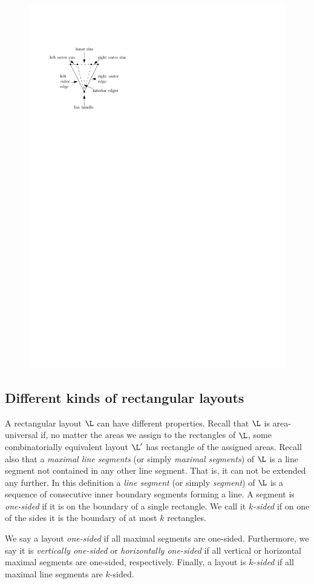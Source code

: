  \begin{figure}[h]
   \centering
   \includegraphics[scale=1]{rectangularDuals/img/fanterms}
   \caption{}
   \label{fig:rect:fanTerms}
 \end{figure}



 \subsection{Different kinds of rectangular layouts}
   A rectangular layout $\L$ can have different properties.
   Recall that $\L$ is area-universal if, no matter the areas we assign to the rectangles of $\L$, some combinatorially equivalent layout $\L'$ has rectangle of the assigned areas.
   Recall also that a \emph{maximal line segments} (or simply \emph{maximal segments}) of $\L$ is a line segment not contained in any other line segment. That is, it can not be extended any further. In this definition a \emph{line segment} (or simply \emph{segment}) of $\L$ is a sequence of consecutive inner boundary segments forming a line.
   A segment is \emph{one-sided} if it is on the boundary of a single rectangle. We call it \emph{$k$-sided} if on one of the sides it is the boundary of at most $k$ rectangles.


   We say a layout \emph{one-sided} if all maximal segments are one-sided.
   Furthermore,  we say it is \emph{vertically one-sided} or \emph{horizontally one-sided} if all vertical or horizontal maximal segments are one-sided, respectively. Finally, a layout is \emph{$k$-sided} if all maximal line segments are $k$-sided.
